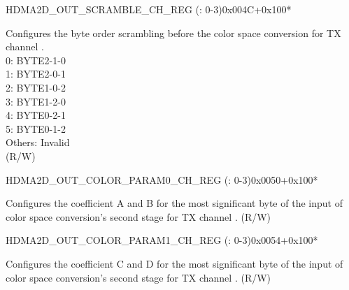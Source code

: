 \begin{register}{H}{DMA2D\_OUT\_SCRAMBLE\_CH\_REG (: 0-3)}{0x004C+0x100*}\label{regdesc:DMA2DOUTSCRAMBLECHNREG}
%
%
\regnewline%
\begin{regdesc}\begin{reglist}
\label{fielddesc:DMA2DOUTSCRAMBLESELPRECHN}\item [DMA2D\_OUT\_SCRAMBLE\_SEL\_PRE\_CH\regindex{n}] Configures the byte order scrambling before the color space conversion for TX channel .\\
0: BYTE2-1-0\\
1: BYTE2-0-1\\
2: BYTE1-0-2\\
3: BYTE1-2-0\\
4: BYTE0-2-1\\
5: BYTE0-1-2\\
Others: Invalid\\ (R/W)
\end{reglist}\end{regdesc}
\end{register}


\begin{register}{H}{DMA2D\_OUT\_COLOR\_PARAM0\_CH\_REG (: 0-3)}{0x0050+0x100*}\label{regdesc:DMA2DOUTCOLORPARAM0CHNREG}
%
%
\regnewline%
\begin{regdesc}\begin{reglist}
\label{fielddesc:DMA2DOUTCOLORPARAMH0CHN}\item [DMA2D\_OUT\_COLOR\_PARAM\_H0\_CH\regindex{n}] Configures the coefficient A and B for the most significant byte of the input of color space conversion's second stage for TX channel . (R/W)
\end{reglist}\end{regdesc}
\end{register}


\begin{register}{H}{DMA2D\_OUT\_COLOR\_PARAM1\_CH\_REG (: 0-3)}{0x0054+0x100*}\label{regdesc:DMA2DOUTCOLORPARAM1CHNREG}
%
%
\regnewline%
\begin{regdesc}\begin{reglist}
\label{fielddesc:DMA2DOUTCOLORPARAMH1CHN}\item [DMA2D\_OUT\_COLOR\_PARAM\_H1\_CH\regindex{n}] Configures the coefficient C and D for the most significant byte of the input of color space conversion's second stage for TX channel . (R/W)
\end{reglist}\end{regdesc}
\end{register}


